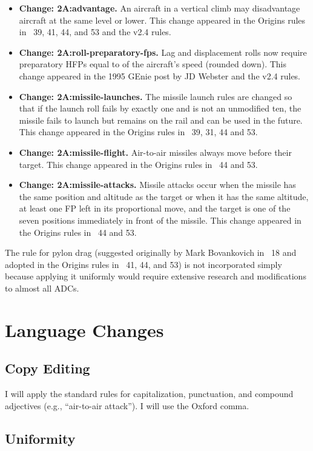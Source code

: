 \documentclass[10pt]{article}
\newcommand{\itemtag}[1]{\item \textbf{Change: #1.}}
\begin{document}
\begin{itemize}
    \itemtag{2A:advantage} An aircraft in a vertical climb may disadvantage aircraft at the same level or lower. This change appeared in the Origins rules in {\APJ}~39, 41, 44, and 53 and the v2.4 rules.

    \itemtag{2A:roll-preparatory-fps} Lag and displacement rolls now require preparatory HFPs equal to {\onethird} of the aircraft's speed (rounded down). This change appeared in the 1995 GEnie post by JD Webster and the v2.4 rules.
    
    \itemtag{2A:missile-launches} The missile launch rules are changed so that if the launch roll fails by exactly one and is not an unmodified ten, the missile fails to launch but remains on the rail and can be used in the future. This change appeared in the Origins rules in \APJ~39, 31, 44 and 53.

    \itemtag{2A:missile-flight} Air-to-air missiles always move before their target. This change appeared in the Origins rules in \APJ~44 and 53.

    \itemtag{2A:missile-attacks} Missile attacks occur when the missile has the same position and altitude as the target or when it has the same altitude, at least one FP left in its proportional move, and the target is one of the seven positions immediately in front of the missile. This change appeared in the Origins rules in \APJ~44 and 53.

\end{itemize}

The rule for pylon drag (suggested originally by Mark Bovankovich in {\APJ}~18 and adopted in the Origins rules in {\APJ}~41, 44, and 53) is not incorporated simply because applying it uniformly would require extensive research and modifications to almost all ADCs.

\section{Language Changes}

\subsection{Copy Editing}

I will apply the standard rules for capitalization, punctuation, and compound adjectives (e.g., “air-to-air attack”). I will use the Oxford comma.

\subsection{Uniformity}
\end{document}
